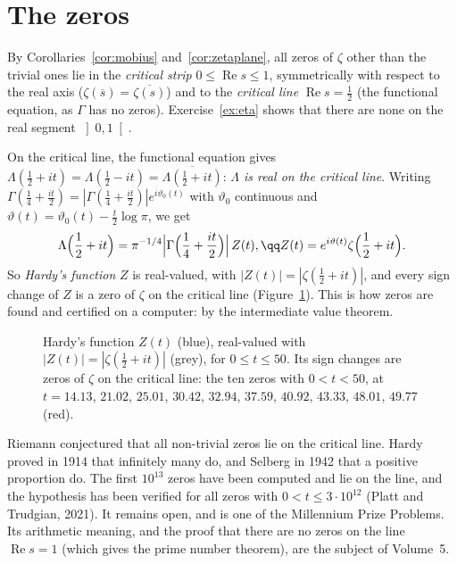 \section{The zeros}

By Corollaries~\ref{cor:mobius} and~\ref{cor:zetaplane}, all zeros of $\zeta$ other than the trivial ones lie in the \emph{critical strip} $0\le\operatorname{Re}s\le1$,
symmetrically with respect to the real axis ($\zeta(\overline s)=\overline{\zeta(s)}$) and to the \emph{critical line} $\operatorname{Re}s=\frac12$ (the functional equation, as $\Gamma$
has no zeros). Exercise~\ref{ex:eta} shows that there are none on the real segment $\left]0,1\right[$.

On the critical line, the functional equation gives $\Lambda(\frac12+it)=\Lambda(\frac12-it)=\overline{\Lambda(\frac12+it)}$: \emph{$\Lambda$ is real on the critical line}. Writing
$\Gamma(\frac14+\frac{it}2)=|\Gamma(\frac14+\frac{it}2)|e^{i\vartheta_0(t)}$ with $\vartheta_0$ continuous and $\vartheta(t)=\vartheta_0(t)-\frac t2\log\pi$, we get
\[
\begin{gathered}\Lambda\Bigl(\frac12+it\Bigr)=\pi^{-1/4}\Bigl|\Gamma\Bigl(\frac14+\frac{it}2\Bigr)\Bigr|\,Z(t),\qq Z(t)=e^{i\vartheta(t)}\zeta\Bigl(\frac12+it\Bigr).\end{gathered}
\]
So \emph{Hardy's function} $Z$ is real-valued, with $|Z(t)|=|\zeta(\frac12+it)|$, and every sign change of $Z$ is a zero of $\zeta$ on the critical
line (Figure~\ref{fig:hardyz}). This is how zeros are found and certified on a computer: by the intermediate value theorem.

\begin{figure}[ht]
\centering
{}
\caption{Hardy's function $Z(t)$ (blue), real-valued with $|Z(t)|=|\zeta(\frac12+it)|$ (grey), for $0\le t\le50$. Its sign changes are zeros of $\zeta$ on the
critical line: the ten zeros with $0<t<50$, at $t=14.13$, $21.02$, $25.01$, $30.42$, $32.94$, $37.59$, $40.92$, $43.33$, $48.01$, $49.77$ (red).}
\label{fig:hardyz}
\end{figure}

\begin{remark}
Riemann conjectured that all non-trivial zeros lie on the critical line. Hardy proved in 1914 that infinitely many do, and
Selberg in 1942 that a positive proportion do. The first $10^{13}$ zeros have been computed and lie on the line, and the
hypothesis has been verified for all zeros with $0<t\le3\cdot10^{12}$ (Platt and Trudgian, 2021). It remains open, and is one of
the Millennium Prize Problems. Its arithmetic meaning, and the proof that there are no zeros on the line $\operatorname{Re}s=1$ (which gives the
prime number theorem), are the subject of Volume~5.
\end{remark}

